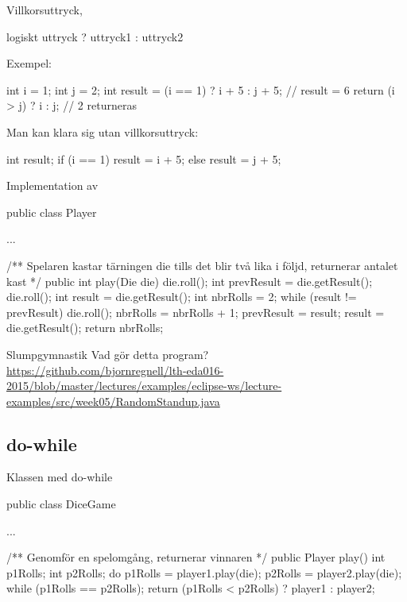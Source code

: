 \documentclass{lecturenotes}
\begin{document}
\begin{Slide}{Villkorsuttryck, }
\begin{Code}
logiskt uttryck ? uttryck1 : uttryck2
\end{Code}

Exempel:
\begin{Code}
int i = 1;
int j = 2;
int result = (i == 1) ? i + 5 : j + 5; // result = 6
return (i > j) ? i : j;                // 2 returneras
\end{Code}

Man kan klara sig utan villkorsuttryck:
\begin{Code}
int result;
if (i == 1) {
    result = i + 5;
} else {
    result = j + 5;
}
\end{Code}
\end{Slide} 

\begin{Slide}{Implementation av }
\begin{Code}
public class Player {
    ...
    
    /** Spelaren kastar tärningen die tills det blir 
        två lika i följd, returnerar antalet kast */
    public int play(Die die) {
        die.roll();
        int prevResult = die.getResult();
        die.roll();
        int result = die.getResult();
        int nbrRolls = 2;
        while (result != prevResult) {
            die.roll();
            nbrRolls = nbrRolls + 1;
            prevResult = result;
            result = die.getResult();
        }
        return nbrRolls;
    }
}
\end{Code}
\end{Slide} 


\begin{Slide}{Slumpgymnastik}
Vad gör detta program? \\
\url{https://github.com/bjornregnell/lth-eda016-2015/blob/master/lectures/examples/eclipse-ws/lecture-examples/src/week05/RandomStandup.java}
\end{Slide}

\subsection{do-while}
\begin{Slide}
{Klassen  med do-while}
\begin{Code}
public class DiceGame {
    ...
    
    /** Genomför en spelomgång, returnerar vinnaren */
    public Player play() {
        int p1Rolls;
        int p2Rolls;
        do  {
            p1Rolls = player1.play(die);
            p2Rolls = player2.play(die);
        } while (p1Rolls == p2Rolls);
        return (p1Rolls < p2Rolls) ?  player1 : player2;
    }
}
\end{Code}
\end{Slide} 
\end{document}

